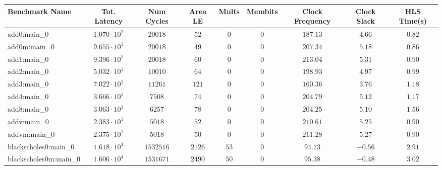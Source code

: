 \begin{tabular}{|l|c|c|c|c|c|c|c|c|}
\hline
Benchmark Name                 & Tot. Latency           & Num Cycles   & Area LE    & Mults    & Membits      & Clock Frequency & Clock Slack & HLS Time(s) \\
\hline
add0:main\_0                   & $ 1.070 \cdot 10^{2} $ & $ 20018    $ & $ 52     $ & $ 0    $ & $ 0        $ & $ 187.13      $ & $ 4.66    $ & $ 0.82    $ \\
add0m:main\_0                  & $ 9.655 \cdot 10^{1} $ & $ 20018    $ & $ 49     $ & $ 0    $ & $ 0        $ & $ 207.34      $ & $ 5.18    $ & $ 0.86    $ \\
add1:main\_0                   & $ 9.396 \cdot 10^{1} $ & $ 20018    $ & $ 60     $ & $ 0    $ & $ 0        $ & $ 213.04      $ & $ 5.31    $ & $ 0.90    $ \\
add2:main\_0                   & $ 5.032 \cdot 10^{1} $ & $ 10010    $ & $ 64     $ & $ 0    $ & $ 0        $ & $ 198.93      $ & $ 4.97    $ & $ 0.99    $ \\
add3:main\_0                   & $ 7.022 \cdot 10^{1} $ & $ 11261    $ & $ 121    $ & $ 0    $ & $ 0        $ & $ 160.36      $ & $ 3.76    $ & $ 1.18    $ \\
add4:main\_0                   & $ 3.666 \cdot 10^{1} $ & $ 7508     $ & $ 74     $ & $ 0    $ & $ 0        $ & $ 204.79      $ & $ 5.12    $ & $ 1.17    $ \\
add8:main\_0                   & $ 3.063 \cdot 10^{1} $ & $ 6257     $ & $ 78     $ & $ 0    $ & $ 0        $ & $ 204.25      $ & $ 5.10    $ & $ 1.56    $ \\
addv:main\_0                   & $ 2.383 \cdot 10^{1} $ & $ 5018     $ & $ 52     $ & $ 0    $ & $ 0        $ & $ 210.61      $ & $ 5.25    $ & $ 0.90    $ \\
addvm:main\_0                  & $ 2.375 \cdot 10^{1} $ & $ 5018     $ & $ 50     $ & $ 0    $ & $ 0        $ & $ 211.28      $ & $ 5.27    $ & $ 0.90    $ \\
blackscholes0:main\_0          & $ 1.618 \cdot 10^{4} $ & $ 1532516  $ & $ 2126   $ & $ 53   $ & $ 0        $ & $ 94.73       $ & $ -0.56   $ & $ 2.91    $ \\
blackscholes0m:main\_0         & $ 1.606 \cdot 10^{4} $ & $ 1531671  $ & $ 2490   $ & $ 50   $ & $ 0        $ & $ 95.38       $ & $ -0.48   $ & $ 3.02    $ \\

\end{tabular}
